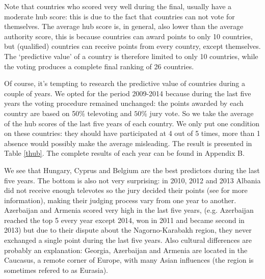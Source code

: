 \documentclass[a4paper,11pt]{report}
\begin{document}
Note that countries who scored very well during 
the final, usually have a moderate hub score: this is due to the fact that 
countries can not vote for themselves. The average hub score is, in general, also 
lower than the average authority score, this is because countries can award 
points to only 10 countries, but (qualified) countries can receive points from 
every country, except themselves. The `predictive value' of a country is 
therefore limited to only 10 countries, while the voting produces a complete final ranking of 26 
countries.

Of course, it's tempting to research the predictive value of countries during a 
couple of years. We opted for the period 2009-2014 because during the last five 
years the voting procedure remained unchanged: the points awarded by each country are based on 50$\%$ televoting and
$50\%$ jury vote. So we take the average of the hub scores of the last five 
years of each country. We only put one condition on these countries: they should 
have participated at 4 out of 5 times, more than 1 absence would possibly make the average misleading.
The result is presented in Table \ref{thub}. The complete results of each year can be found in Appendix B. 

We see that Hungary, Cyprus and Belgium are the best predictors during the last 
five years. The bottom is also not very surprising: in 2010, 2012 and 2013 Albania did not 
receive enough televotes so the jury decided their points (see \cite{eurovision} for more information), making their judging process vary from one year to another.
Azerbaijan and Armenia scored very high in the last five years, (e.g. Azerbaijan reached the top 5
every year except 2014, won in 2011 and became second in 2013) 
but due to their dispute about the Nagorno-Karabakh region, they never exchanged a 
single
point during the last five years. Also cultural differences are probably an 
explanation: Georgia, Azerbaijan and Armenia are located in the Caucasus, a remote corner of Europe, with 
many Asian influences (the region is sometimes refered to as Eurasia). 
\end{document}

